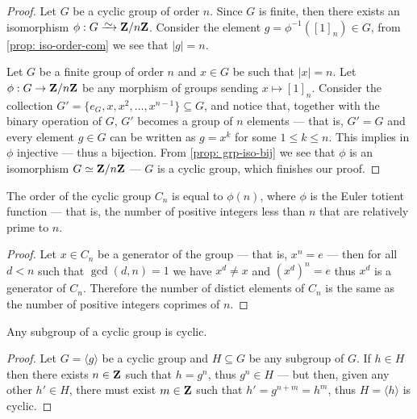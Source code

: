 \begin{proof}
Let \(G\) be a cyclic group of order \(n\). Since \(G\) is finite, then there
exists an isomorphism \(\phi: G \isoto \Z/n\Z\). Consider the element \(g =
\phi^{-1}({[1]}_n) \in G\), from \cref{prop: iso-order-com} we see that \(|g| =
n\).

Let \(G\) be a finite group of order \(n\) and \(x \in G\) be such that \(|x|
= n\). Let \(\phi: G \to \mathbf{Z}/n\mathbf{Z}\) be any morphism of groups sending \(x
\mapsto {[1]}_n\). Consider the collection \(G' = \{e_G, x, x^2, \dots,
x^{n-1}\} \subseteq G\), and notice that, together with the binary operation
of \(G\), \(G'\) becomes a group of \(n\) elements --- that is, \(G' = G\) and
every element \(g \in G\) can be written as \(g = x^k\) for some \(1 \leq k
\leq n\). This implies in \(\phi\) injective --- thus a bijection. From
\cref{prop: grp-iso-bij} we see that \(\phi\) is an isomorphism \(G \simeq
\mathbf{Z}/n\mathbf{Z}\) --- \(G\) is a cyclic group, which finishes our proof.
\end{proof}

\begin{proposition}
\label{prop:order-cyclic-totient}
The order of the cyclic group \(C_n\) is equal to \(\phi(n)\), where \(\phi\) is
the Euler totient function --- that is, the number of positive integers less
than \(n\) that are relatively prime to \(n\).
\end{proposition}

\begin{proof}
Let \(x \in C_n\) be a generator of the group --- that is, \(x^n = e\) --- then
for all \(d < n\) such that \(\gcd(d, n) = 1\) we have \(x^d \neq x\) and
\((x^d)^n = e\) thus \(x^d\) is a generator of \(C_n\). Therefore the number
of distict elements of \(C_n\) is the same as the number of positive integers
coprimes of \(n\).
\end{proof}

\begin{proposition}[Subgroup]
\label{prop:subgroup-of-cyclic-group}
Any subgroup of a cyclic group is cyclic.
\end{proposition}

\begin{proof}
Let \(G = \langle g \rangle\) be a cyclic group and \(H \subseteq G\) be any
subgroup of \(G\). If \(h \in H\) then there exists \(n \in \mathbf{Z}\) such that \(h =
g^n\), thus \(g^n \in H\) --- but then, given any other \(h' \in H\), there must
exist \(m \in \mathbf{Z}\) such that \(h' = g^{n + m} = h^m\), thus \(H = \langle h
\rangle\) is cyclic.
\end{proof}

